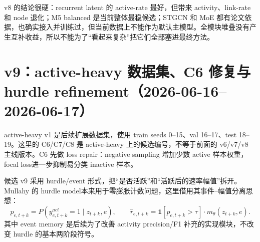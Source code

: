 \documentclass[UTF8,a4paper,11pt]{ctexart}
\newcommand{\code}[1]{\texttt{#1}}
\begin{document}
v8 的结论很硬：recurrent latent 的 active-rate 最好，但带来 activity、link-rate 和 node 退化；M5 balanced 是当前整体最稳候选；STGCN 和 MoE 都有论文依据，也确实接入并训练过，但当前数据上不能作为默认主模型。全模块堆叠没有产生互补收益，所以不能为了“看起来复杂”把它们全部塞进最终方法。

\section{v9：active-heavy 数据集、C6 修复与 hurdle refinement（2026-06-16--2026-06-17）}

active-heavy v1 是后续扩展数据集，使用 train seeds 0--15、val 16--17、test 18--19。这里的 C6/C7/C8 是 active-heavy 上的候选编号，不等于前面的 v6/v7/v8 主线版本。C6 先做 loss repair：negative sampling 增加少数 active 样本权重，focal loss进一步抑制易分类 inactive 样本。

\begin{table}[H]
\centering
\small
{}
\caption{active-heavy v1 与 C6 loss repair 结果，来源为 \code{c6\_loss\_repair\_comparison.md} 和 candidate-pruning 追加结果。}
\end{table}

候选 v9 采用 hurdle/event 形式，把“是否活跃”和“活跃后的速率幅值”拆开。Mullahy 的 hurdle model本来用于零膨胀计数问题，这里借用其事件--幅值分离思想：
\[
p_{e,t+k}=P(y_{e,t+k}^{act}=1\mid z_{t+k},e),
\qquad
\hat r_{e,t+k}=\mathbf{1}[p_{e,t+k}>\tau]\cdot m_\theta(z_{t+k},e).
\]
其中 event memory 是后续为了改善 activity precision/F1 补充的实现模块，不改变 hurdle 的基本两阶段符号。
\end{document}
